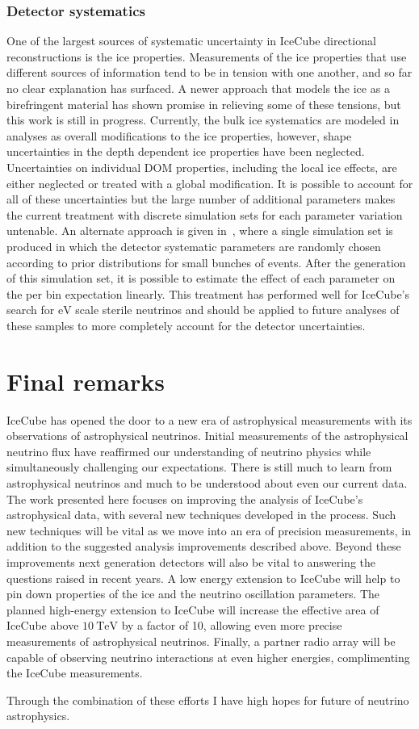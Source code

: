 \subsubsection{Detector systematics}
One of the largest sources of systematic uncertainty in IceCube directional reconstructions is the ice properties.
Measurements of the ice properties that use different sources of information tend to be in tension with one another, and so far no clear explanation has surfaced.
A newer approach that models the ice as a birefringent material has shown promise in relieving some of these tensions, but this work is still in progress.
Currently, the bulk ice systematics are modeled in analyses as overall modifications to the ice properties, however, shape uncertainties in the depth dependent ice properties have been neglected.
Uncertainties on individual DOM properties, including the local ice effects, are either neglected or treated with a global modification.
It is possible to account for all of these uncertainties but the large number of additional parameters makes the current treatment with discrete simulation sets for each parameter variation untenable.
An alternate approach is given in~\cite{Aartsen:2019jcj}, where a single simulation set is produced in which the detector systematic parameters are randomly chosen according to prior distributions for small bunches of events.
After the generation of this simulation set, it is possible to estimate the effect of each parameter on the per bin expectation linearly.
This treatment has performed well for IceCube's search for $\si\eV$ scale sterile neutrinos and should be applied to future analyses of these samples to more completely account for the detector uncertainties.

\section{Final remarks}
IceCube has opened the door to a new era of astrophysical measurements with its observations of astrophysical neutrinos.
Initial measurements of the astrophysical neutrino flux have reaffirmed our understanding of neutrino physics while simultaneously challenging our expectations.
There is still much to learn from astrophysical neutrinos and much to be understood about even our current data.
The work presented here focuses on improving the analysis of IceCube's astrophysical data, with several new techniques developed in the process.
Such new techniques will be vital as we move into an era of precision measurements, in addition to the suggested analysis improvements described above.
Beyond these improvements next generation detectors will also be vital to answering the questions raised in recent years.
A low energy extension to IceCube will help to pin down properties of the ice and the neutrino oscillation parameters.
The planned high-energy extension to IceCube will increase the effective area of IceCube above $\SI{10}\TeV$ by a factor of 10, allowing even more precise measurements of astrophysical neutrinos.
Finally, a partner radio array will be capable of observing neutrino interactions at even higher energies, complimenting the IceCube measurements.

Through the combination of these efforts I have high hopes for future of neutrino astrophysics.
